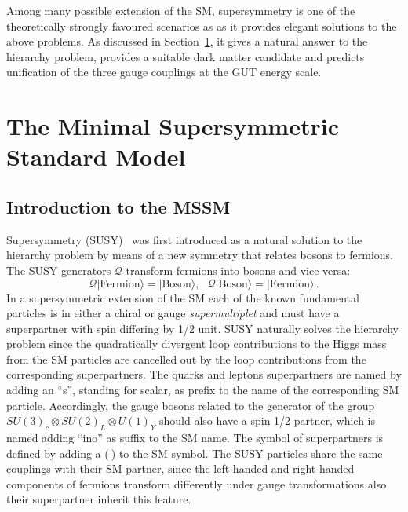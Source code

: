 \vspace{0.5cm}
Among many possible extension of the SM, supersymmetry is one of the  theoretically strongly favoured scenarios as 
as it provides elegant solutions to the above problems. 
As discussed in Section~\ref{sec:MSSM}, it gives a natural answer to the hierarchy problem, provides a suitable dark matter candidate 
and predicts unification of the three gauge couplings at the GUT energy scale.


%
%

 
\section{The Minimal Supersymmetric Standard Model}\label{sec:MSSM}
\subsection{Introduction to the MSSM}
Supersymmetry (SUSY)~\cite{Susy1,Susy2,Susy3} was first introduced as a natural  solution to the hierarchy problem by means of
a new symmetry that relates bosons to fermions.
The SUSY generators $\mathcal{Q}$ transform fermions into bosons and vice versa:
\begin{equation}
\mathcal{Q}|\text{Fermion}\rangle = |\text{Boson}\rangle, ~ ~ ~ \mathcal{Q}|\text{Boson}\rangle = |\text{Fermion}\rangle\,.
\end{equation}
In a supersymmetric extension of the SM  each of the known fundamental particles 
is in either a chiral or gauge \emph{supermultiplet} and must have a superpartner with spin differing by 1/2 unit.
SUSY naturally solves the hierarchy problem since the quadratically divergent loop contributions to the Higgs mass from the SM 
particles are cancelled out by the loop contributions from the corresponding superpartners. 
The quarks and leptons  superpartners are named by adding an ``s'', standing for scalar, as prefix to the name of the corresponding
SM particle.
Accordingly, the gauge bosons related to the generator of the group $SU(3)_c \otimes SU(2)_L \otimes U(1)_Y$ should also have a spin 1/2 partner,
which is named adding ``ino'' as suffix to the SM name. The symbol of superpartners is defined by adding a ($\tilde{ ~ }$) to the SM symbol.
The SUSY particles share the same couplings with their SM partner, since the left-handed and right-handed components of fermions 
transform differently under gauge transformations also their superpartner inherit this feature.

